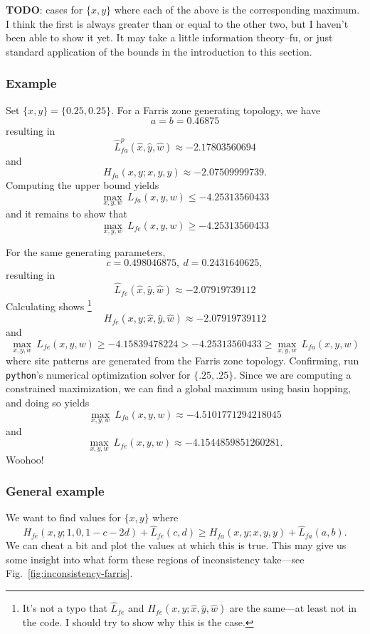 \documentclass[a4paper]{article}
\begin{document}
\textbf{TODO}: cases for $\{x, y\}$ where each of the above is the corresponding maximum.
I think the first is always greater than or equal to the other two, but I haven't been able to show it yet.
It may take a little information theory--fu, or just standard application of the bounds in the introduction to this section.

\subsubsection{Example}

Set $\{x, y\} = \{0.25, 0.25\}$.
For a Farris zone generating topology, we have
$$
a = b = 0.46875
$$
resulting in
$$
\hat{L}_{fa}^{p}(\hat{x}, \hat{y}, \hat{w}) \approx -2.17803560694
$$
and
$$
H_{fa}(x,y;x,y,y) \approx -2.07509999739.
$$
Computing the upper bound yields
$$
\max_{x,y,w} \ L_{fa}(x,y,w) \le -4.25313560433
$$
and it remains to show that 
$$
\max_{x,y,w} \ L_{fe}(x,y,w) \ge -4.25313560433
$$

For the same generating parameters,
$$
c = 0.498046875, \ d = 0.2431640625,
$$
resulting in
$$
\hat{L}_{fe}(\hat{x}, \hat{y}, \hat{w}) \approx -2.07919739112
$$
Calculating shows%
    \footnote{It's not a typo that $\hat{L}_{fe}$ and $H_{fe}(x,y; \hat{x}, \hat{y}, \hat{w})$ are the same---at least not in the code.
        I should try to show why this is the case.
        }
$$
H_{fe}(x,y; \hat{x}, \hat{y}, \hat{w}) \approx -2.07919739112
$$
and
$$
\max_{x,y,w} \ L_{fe}(x,y,w) \ge -4.15839478224 > -4.25313560433 \ge \max_{x,y,w} \ L_{fa}(x,y,w)
$$
where site patterns are generated from the Farris zone topology.
Confirming, run \texttt{python}'s numerical optimization solver for $\{.25, .25\}$.
Since we are computing a constrained maximization, we can find a global maximum using basin hopping, and doing so yields
$$
\max_{x,y,w} \ L_{fa}(x,y,w) \approx -4.5101771294218045
$$
and
$$
\max_{x,y,w} \ L_{fe}(x,y,w) \approx -4.1544859851260281.
$$
Woohoo!

\subsubsection{General example}

We want to find values for $\{x,y\}$ where
$$
H_{fe}(x,y; 1, 0, 1-c-2d) + \hat{L}_{fe}(c,d) \ge H_{fa}(x,y; x, y, y) + \hat{L}_{fa}(a,b).
$$
We can cheat a bit and plot the values at which this is true.
This may give us some insight into what form these regions of inconsistency take---see Fig.~\ref{fig:inconsistency-farris}.
\end{document}
